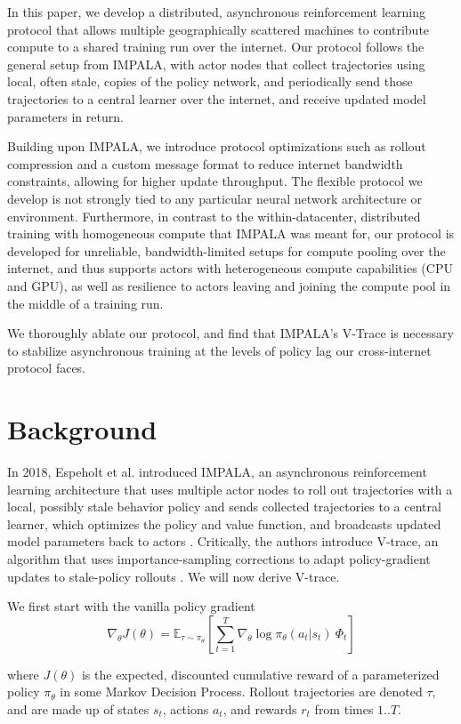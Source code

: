 \documentclass{article}
\begin{document}
In this paper, we develop a distributed, asynchronous reinforcement learning protocol that
allows multiple geographically scattered machines to contribute compute to a shared training run
over the internet.
Our protocol follows the general setup from IMPALA, with actor nodes that collect trajectories using local,
often stale, copies of the policy network, and periodically send those trajectories to a central learner
over the internet, and receive updated model parameters in return.

Building upon IMPALA, we introduce protocol optimizations such as rollout compression and a custom message
format to reduce internet bandwidth constraints, allowing for higher update throughput. The flexible protocol we
develop is not strongly tied to any particular neural network architecture or environment. Furthermore,
in contrast to the within-datacenter, distributed training with homogeneous compute that IMPALA was meant for,
our protocol is developed for unreliable, bandwidth-limited setups for compute pooling over the internet, and
thus supports actors with heterogeneous compute capabilities (CPU and GPU), as well as resilience to actors
leaving and joining the compute pool in the middle of a training run.

We thoroughly ablate our protocol, and find that IMPALA's V-Trace is necessary to stabilize asynchronous
training at the levels of policy lag our cross-internet protocol faces.


\section{Background}
In 2018, Espeholt et al. introduced IMPALA, an asynchronous reinforcement learning architecture that uses
multiple actor nodes to roll out trajectories with a local, possibly stale behavior policy and sends collected
trajectories to a central learner, which optimizes the policy and value function, and broadcasts updated
model parameters back to actors \cite{espeholt2018impala}. Critically, the authors introduce V-trace, an
algorithm that uses importance-sampling corrections to adapt policy-gradient updates to stale-policy
rollouts \cite{espeholt2018impala}. We will now derive V-trace.

We first start with the vanilla policy gradient
$$
\nabla_\theta J(\theta) = \mathbb{E}_{\tau \sim \pi_\theta}
\left[ \sum_{t=1}^T \nabla_\theta \log \pi_\theta(a_t|s_t) \ \Phi_t \right]
$$

where $J(\theta)$ is the expected, discounted cumulative reward of a parameterized policy $\pi_\theta$ in some
Markov Decision Process. Rollout trajectories are denoted $\tau$, and are made up of states $s_t$, actions $a_t$,
and rewards $r_t$ from times $1..T$.
\end{document}
